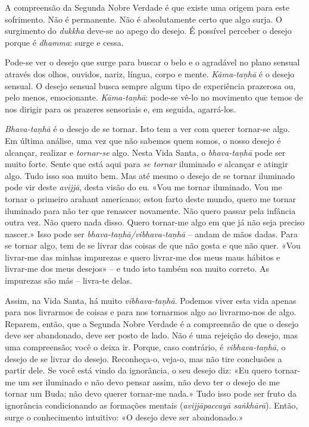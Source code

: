 A compreensão da Segunda Nobre Verdade é que existe uma origem para este
sofrimento. Não é permanente. Não é absolutamente certo que algo surja. O
surgimento do \emph{dukkha} deve-se ao apego do desejo. É possível perceber o
desejo porque é \emph{dhamma}: surge e cessa.

Pode-se ver o desejo que surge para buscar o belo e o agradável no plano
sensual através dos olhos, ouvidos, nariz, língua, corpo e mente.
\emph{Kāma-taṇhā} é o desejo sensual. O desejo sensual busca sempre algum tipo
de experiência prazerosa ou, pelo menos, emocionante. \emph{Kāma-taṇhā}:
pode-se vê-lo no movimento que temos de nos dirigir para os prazeres
sensoriais e, em seguida, agarrá-los.

\emph{Bhava-taṇhā} é o desejo de se tornar. Isto tem a ver com querer
tornar-se algo. Em última análise, uma vez que não sabemos quem somos, o nosso
desejo é alcançar, realizar e \emph{tornar-se} algo. Nesta Vida Santa, o
\emph{bhava-taṇhā} pode ser muito forte. Sente que está aqui para \emph{se
  tornar} iluminado e alcançar e atingir algo. Tudo isso soa muito bem. Mas até
mesmo o desejo de se tornar iluminado pode vir deste \emph{avijjā}, desta visão
do eu. «Vou me tornar iluminado. Vou me tornar o primeiro arahant americano;
estou farto deste mundo, quero me tornar iluminado para não ter que renascer
novamente. Não quero passar pela infância outra vez. Não quero nada disso. Quero
tornar-me algo em que já não seja preciso nascer.» Isso pode ser
\emph{bhava-taṇhā/vibhava-taṇhā} -- andam de mãos dadas. Para se tornar algo,
tem de se livrar das coisas de que não gosta e que não quer. «Vou livrar-me das
minhas impurezas e quero livrar-me dos meus maus hábitos e livrar-me dos meus
desejos» -- e tudo isto também soa muito correto. As impurezas são más --
livra-te delas.

Assim, na Vida Santa, há muito \emph{vibhava-taṇhā}. Podemos viver esta vida
apenas para nos livrarmos de coisas e para nos tornarmos algo ao livrarmo-nos
de algo. Reparem, então, que a Segunda Nobre Verdade é a compreensão de que o
desejo deve ser abandonado, deve ser posto de lado. Não é uma rejeição do
desejo, mas uma compreensão; você o deixa ir. Porque, caso contrário, é
\emph{vibhava-taṇhā}, o desejo de se livrar do desejo. Reconheça-o, veja-o,
mas não tire conclusões a partir dele. Se você está vindo da ignorância, o seu
desejo diz: «Eu quero tornar-me um ser iluminado e não devo pensar assim, não
devo ter o desejo de me tornar um Buda; não devo querer tornar-me nada.» Tudo
isso pode ser fruto da ignorância condicionando as formações mentais
(\emph{avijjāpaccayā saṅkhārā}). Então, surge o conhecimento intuitivo:
«O desejo deve ser abandonado.»

